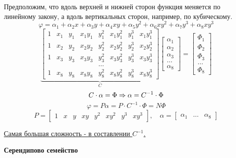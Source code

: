 \documentclass{bmstu}
\begin{document}
		Предположим, что вдоль верхней и нижней сторон функция меняется по линейному закону, а вдоль вертикальных сторон, например, по кубическому.
		\[
		\varphi=\alpha_1+\alpha_2x+\alpha_3y+\alpha_4xy+\alpha_5y^2+\alpha_6xy^2+\alpha_7y^3+\alpha_8xy^3
		\]
		\[
		\underbrace{\begin{bmatrix}
			1 & x_1 & y_1 & x_1y_1 & y_1^2 & x_1y_1^2 & y_1^3 & x_1y_1^3 \\
			1 & x_2 & y_2 & x_2y_2 & y_2^2 & x_2y_2^2 & y_2^3 & x_2y_2^3 \\
			1 & x_3 & y_3 & x_3y_3 & y_3^2 & x_3y_3^2 & y_3^3 & x_3y_3^3 \\
			& & &  & \dots& & &  \\
			1 & x_8 & y_8 & x_8y_8 & y_8^2 & x_8y_8^2 & y_8^3 & x_8y_8^3 
		\end{bmatrix}}_C \begin{bmatrix}
		\alpha_1 \\ \alpha_2 \\ \alpha_3 \\ \dots \\ \alpha_8 
		\end{bmatrix} = \begin{bmatrix}
		\Phi_1 \\ \Phi_2 \\ \Phi_3 \\ \dots \\ \Phi_8
		\end{bmatrix}
		\]
		\[
		C\cdot\alpha=\Phi \Rightarrow \alpha=C^{-1} \cdot \Phi \\
		\]
		\[
		\varphi=P\alpha=P\cdot C^{-1} \cdot \Phi = N\Phi
		\]
		\[
		P=\begin{bmatrix}
			1 & x & y & xy & y^2 & xy^2 & y^3 & xy^3
		\end{bmatrix}, \quad \alpha=\begin{bmatrix}
		\alpha_1 & \dots & \alpha_8
		\end{bmatrix}
		\]
		
		\underline{Самая большая сложность - в составлении $C^{-1}$.}
		
		\newpage
		\begin{center}
			\textbf{Серендипово семейство}
		\end{center}

		\begin{center}
		\end{center}
		
\end{document}
